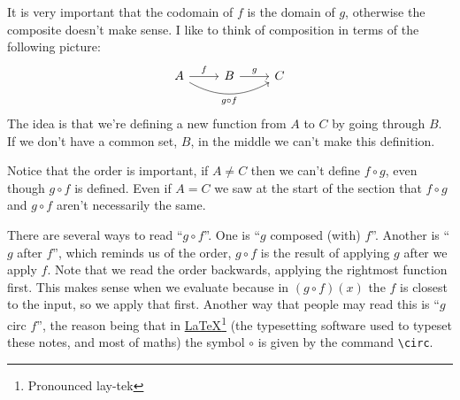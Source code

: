 \documentclass[fleqn]{LectureClass/LectureClass}
\begin{document}
    It is very important that the codomain of \(f\) is the domain of \(g\), otherwise the composite doesn't make sense.
    I like to think of composition in terms of the following picture:
    \begin{equation}
        \begin{tikzcd}
            A \arrow[r, "f"] \arrow[rr, bend right, "g \circ f"'] & B \arrow[r, "g"] & C
        \end{tikzcd}
    \end{equation}
    The idea is that we're defining a new function from \(A\) to \(C\) by going through \(B\).
    If we don't have a common set, \(B\), in the middle we can't make this definition.
    
    Notice that the order is important, if \(A \ne C\) then we can't define \(f \circ g\), even though \(g \circ f\) is defined.
    Even if \(A = C\) we saw at the start of the section that \(f \circ g\) and \(g \circ f\) aren't necessarily the same.
    
    There are several ways to read \enquote{\(g \circ f\)}.
    One is \enquote{\(g\) composed (with) \(f\)}.
    Another is \enquote{\(g\) after \(f\)}, which reminds us of the order, \(g \circ f\) is the result of applying \(g\) after we apply \(f\).
    Note that we read the order backwards, applying the rightmost function first.
    This makes sense when we evaluate because in \((g \circ f)(x)\) the \(f\) is closest to the input, so we apply that first.
    Another way that people may read this is \enquote{\(g\) circ \(f\)}, the reason being that in \href{https://www.overleaf.com/learn/latex/Learn_LaTeX_in_30_minutes}{\LaTeX}\footnote{Pronounced lay-tek} (the typesetting software used to typeset these notes, and most of maths) the symbol \(\circ\) is given by the command \lstinline[basicstyle=\color{black!85}\ttfamily]|\circ|.
    
\end{document}
